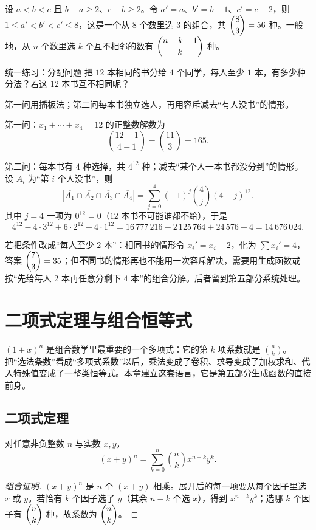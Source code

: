 \sol 设 $a<b<c$ 且 $b-a\ge2$、$c-b\ge2$。令 $a'=a$、$b'=b-1$、$c'=c-2$，则 $1\le a'<b'<c'\le8$，这是一个从 $8$ 个数里选 $3$ 的组合，共 $\dbinom83=56$ 种。一般地，从 $n$ 个数里选 $k$ 个互不相邻的数有 $\dbinom{n-k+1}{k}$ 种。

\begin{problem}{统一练习：分配问题}
把 $12$ 本相同的书分给 $4$ 个同学，每人至少 $1$ 本，有多少种分法？若这 $12$ 本书互不相同呢？
\end{problem}
\hint 第一问用插板法；第二问每本书独立选人，再用容斥减去“有人没书”的情形。

\sol 第一问：$x_1+\cdots+x_4=12$ 的正整数解数为
\[
\binom{12-1}{4-1}=\binom{11}{3}=165.
\]

第二问：每本书有 $4$ 种选择，共 $4^{12}$ 种；减去“某个人一本书都没分到”的情形。设 $A_i$ 为“第 $i$ 个人没书”，则
\[
\left|\overline{A_1}\cap\overline{A_2}\cap\overline{A_3}\cap\overline{A_4}\right|
=\sum_{j=0}^{4}(-1)^j\binom4j(4-j)^{12}.
\]
其中 $j=4$ 一项为 $0^{12}=0$（$12$ 本书不可能谁都不给），于是
\[
4^{12}-4\cdot3^{12}+6\cdot2^{12}-4\cdot1^{12}
=16\,777\,216-2\,125\,764+24\,576-4=14\,676\,024.
\]

\begin{teach}[从“至少 $1$ 本”到“至少 $2$ 本”]
若把条件改成“每人至少 $2$ 本”：相同书的情形令 $x_i'=x_i-2$，化为 $\sum x_i'=4$，答案 $\dbinom73=35$；但\textbf{不同}书的情形再也不能用一次容斥解决，需要用生成函数或按“先给每人 $2$ 本再任意分剩下 $4$ 本”的组合分解。后者留到第五部分系统处理。
\end{teach}

\chapter{二项式定理与组合恒等式}
\begin{chapterintro}[章节导读]
$(1+x)^n$ 是组合数学里最重要的一个多项式：它的第 $k$ 项系数就是 $\binom nk$。把“选法条数”看成“多项式系数”以后，乘法变成了卷积、求导变成了加权求和、代入特殊值变成了一整类恒等式。本章建立这套语言，它是第五部分生成函数的直接前身。
\end{chapterintro}

\section{二项式定理}
\begin{theorem}[二项式定理]
对任意非负整数 $n$ 与实数 $x,y$，
\[
(x+y)^n=\sum_{k=0}^{n}\binom nk x^{n-k}y^{k}.
\]
\end{theorem}
\begin{proof}[组合证明]
$(x+y)^n$ 是 $n$ 个 $(x+y)$ 相乘。展开后的每一项要从每个因子里选 $x$ 或 $y$。若恰有 $k$ 个因子选了 $y$（其余 $n-k$ 个选 $x$），得到 $x^{n-k}y^k$；选哪 $k$ 个因子有 $\dbinom nk$ 种，故系数为 $\dbinom nk$。
\end{proof}

